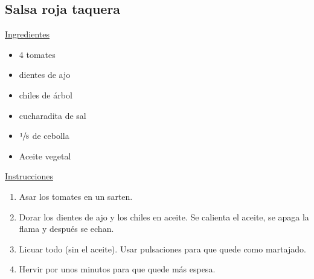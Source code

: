 \subsection{Salsa roja taquera}

\underline{Ingredientes}
\begin{itemize}
\item 4 tomates
\item {} dientes de ajo
\item {} chiles de árbol
\item {} cucharadita de sal
\item \Sim $\sfrac{1}{8}$ de cebolla
\item Aceite vegetal
\end{itemize}

\underline{Instrucciones}
\begin{enumerate}
\item Asar los tomates en un sarten.
\item Dorar los dientes de ajo y los chiles en aceite. Se calienta el aceite, se apaga la flama y después se echan.
\item Licuar todo (sin el aceite). Usar pulsaciones para que quede como martajado.
\item Hervir por unos minutos para que quede más espesa.
\end{enumerate}
